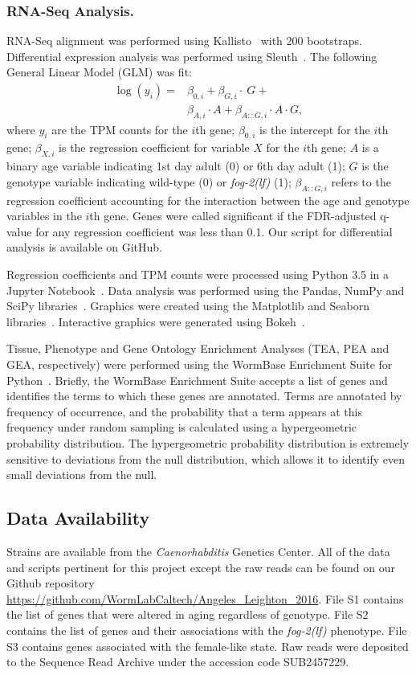 \documentclass[9pt,twocolumn,twoside]{gsag3jnl}
\newcommand{\fog}{\emph{\mbox{fog-2(lf)}}}
\begin{document}
\subsubsection*{RNA-Seq Analysis.}
RNA-Seq alignment was performed using Kallisto~\citep{Bray2016} with 200
bootstraps.
Differential expression analysis was performed using Sleuth~\citep{Pimentel2016}.
The following General Linear Model (GLM) was fit:
\begin{align*}
  \log(y_i) =& \beta_{0,i} + \beta_{G,i}\cdot~G + \\
  &\beta_{A,i}\cdot A + \beta_{A::G,i}\cdot A\cdot G,
  \label{eqn:GLM}
\end{align*}
where $y_i$ are the TPM counts for the $i$th gene; $\beta_{0,i}$ is the intercept
for the $i$th gene; $\beta_{X,i}$ is the regression coefficient for variable
$X$ for the $i$th gene; $A$ is a binary age variable indicating 1st day adult
(0) or 6th day adult (1); $G$ is the genotype variable indicating wild-type
(0) or \fog{} (1); $\beta_{A::G, i}$ refers to the regression coefficient
accounting for the interaction between the age and genotype variables in the
$i$th gene. Genes were called significant if the FDR-adjusted q-value for any
regression coefficient was less than 0.1. Our script for differential analysis
is available on GitHub.

Regression coefficients and TPM counts were processed using Python 3.5 in a
Jupyter Notebook~\citep{Perez2007}. Data analysis was performed using the Pandas,
NumPy and SciPy libraries~\citep{McKinney2011,VanDerWalt2011,Oliphant2007}.
Graphics were created using the Matplotlib and Seaborn
libraries~\citep{Waskom,Hunter2007}. Interactive graphics were generated using
Bokeh~\citep{Team2014}.

Tissue, Phenotype and Gene Ontology Enrichment Analyses (TEA, PEA and GEA,
respectively) were performed using the WormBase Enrichment Suite for
Python~\citep{Angeles-Albores2016,Angeles-Albores106369}. Briefly, the WormBase
Enrichment Suite accepts a list of genes and identifies the terms to which these
genes are annotated. Terms are annotated by frequency of occurrence, and the
probability that a term appears at this frequency under random sampling is
calculated using a hypergeometric probability distribution. The hypergeometric
probability distribution is extremely sensitive to deviations from the null
distribution, which allows it to identify even small deviations from the null.

\subsection*{Data Availability}
\label{sb:data_availability}
Strains are available from the \emph{Caenorhabditis} Genetics Center. All of the
data and scripts pertinent for this project except the raw reads can be found on
our Github repository
\url{https://github.com/WormLabCaltech/Angeles_Leighton_2016}. File S1 contains
the list of genes that were altered in aging regardless of genotype. File S2
contains the list of genes and their associations with the \fog{} phenotype.
File S3 contains genes associated with the female-like state. Raw reads were
deposited to the Sequence Read Archive under the accession code SUB2457229.
\end{document}
